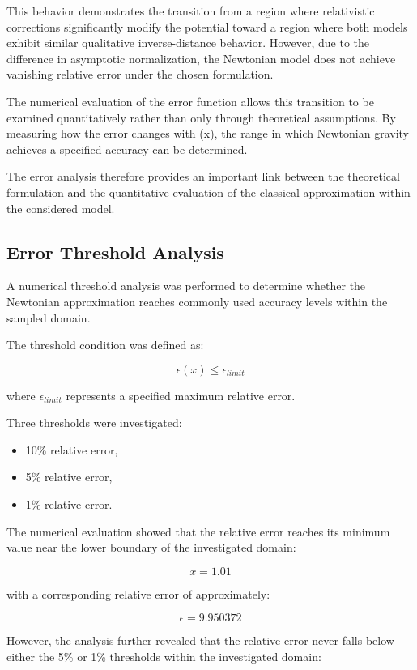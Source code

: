 \documentclass[
]{article}
\providecommand{\tightlist}{
  \setlength{\itemsep}{0pt}\setlength{\parskip}{0pt}}
\begin{document}
This behavior demonstrates the transition from a region where
relativistic corrections significantly modify the potential toward a
region where both models exhibit similar qualitative inverse-distance
behavior. However, due to the difference in asymptotic normalization,
the Newtonian model does not achieve vanishing relative error under the
chosen formulation.

The numerical evaluation of the error function allows this transition to
be examined quantitatively rather than only through theoretical
assumptions. By measuring how the error changes with (x), the range in
which Newtonian gravity achieves a specified accuracy can be determined.

The error analysis therefore provides an important link between the
theoretical formulation and the quantitative evaluation of the classical
approximation within the considered model.

\subsection{Error Threshold Analysis}\label{error-threshold-analysis}

A numerical threshold analysis was performed to determine whether the
Newtonian approximation reaches commonly used accuracy levels within the
sampled domain.

The threshold condition was defined as:

\[
\epsilon(x)\leq \epsilon_{limit}
\]

where $\epsilon_{limit}$ represents a specified maximum relative
error.

Three thresholds were investigated:

\begin{itemize}
\tightlist
\item
  10\% relative error,
\item
  5\% relative error,
\item
  1\% relative error.
\end{itemize}

The numerical evaluation showed that the relative error reaches its
minimum value near the lower boundary of the investigated domain:

\[
x = 1.01
\]

with a corresponding relative error of approximately:

\[
\epsilon = 9.950372%
\]

However, the analysis further revealed that the relative error never
falls below either the 5\% or 1\% thresholds within the investigated
domain:
\end{document}
